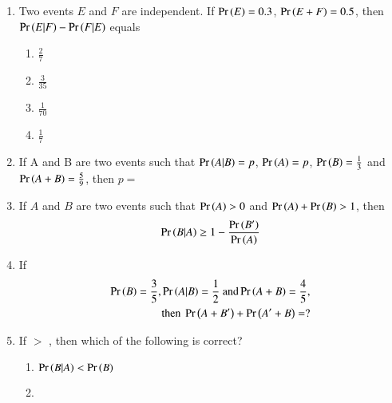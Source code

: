 \begin{enumerate}[label=\thesubsection.\arabic*,ref=\thesubsection.\theenumi]
\begin{multicols}{4}
\begin{enumerate}
\item $1-\pr{A|B}$
\item $1-\pr{A^\prime|B}$
\item $\frac{1-\pr{A+B}}{\pr{B^\prime}}$
\item $\frac{\pr{A^\prime}}{\pr{B^\prime}}$
\end{enumerate}
\end{multicols}
\solution

\item  Two events $E$ and $F$ are independent. If $\Pr\left(E\right) = 0.3$, $\Pr\left(E+F\right) = 0.5$, then $\Pr\left(E|F\right)-\Pr\left(F|E\right)$ equals
\begin{multicols}{4}
\begin{enumerate}
    \item $\frac{2}{7}$
    \item $\frac{3}{35}$
    \item $\frac{1}{70}$
    \item $\frac{1}{7}$
\end{enumerate}
\end{multicols}
\solution

\item If A and B are two events such that $\Pr\left(A|B\right)=p$, $\Pr\left(A\right)=p$, $\Pr\left(B\right)=\frac{1}{3}$ and $\Pr\left(A+B\right)=\frac{5}{9}$, then $p=$\\
\solution

\item If $A$ and $B$ are two events such that $\Pr\left(A\right) > 0$ and $\Pr\left(A\right) + \Pr\left(B\right) > 1$, then 
\begin{align}
    \pr{B | A} \geq 1 - \frac{\pr{B^\prime}}{\pr{A}}
	\label{eq:12/13/3/102/final}
\end{align}
\solution

\item If 
\begin{align}
\Pr\left(B\right) = \frac{3}{5},
\Pr\left(A|B\right) = \frac{1}{2} \text{ and}
\Pr\left(A + B\right) = \frac{4}{5}, 
\\
\text{then }
\Pr\left(A + B^{\prime}\right) + \Pr\left(A^{\prime} + B\right) =?
\end{align}
\solution

\item
 If  $>$ , then which of the following is correct? 
\begin{multicols}{2}
\begin{enumerate}
 \item  
 \label{12.13.6.18.A}
$ \Pr\left(B|A\right) < \Pr\left(B\right)$
 \item 

\end{enumerate}
\end{multicols}
\end{enumerate}
